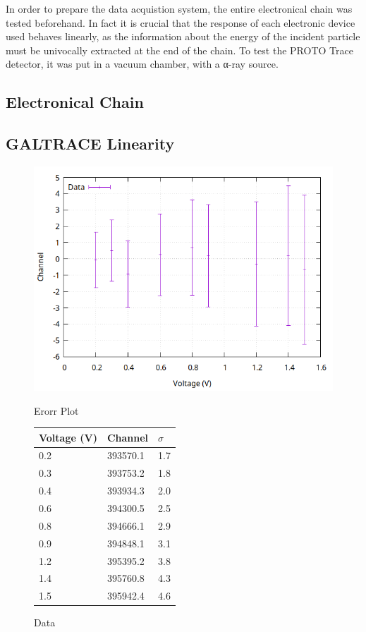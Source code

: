 In order to prepare the data acquistion system, the entire electronical chain
was tested beforehand. In fact it is crucial that the response of each
electronic device used behaves linearly, as the information about the energy
of the incident particle must be univocally extracted at the end of the chain.
To test the PROTO Trace detector, it was put in a vacuum chamber, with a α-ray
source.

\subsection{Electronical Chain}

\subsection{GALTRACE Linearity}

\begin{figure}[h]
  \centering
  \begin{minipage}[b]{0.45\textwidth}
    \includegraphics[width=\textwidth]{img/first_board_line/data_2/calib_1.png}
    \caption{Erorr Plot}
    \label{calib:plot:1}
  \end{minipage}
  \hfill
  \begin{minipage}[b]{0.45\textwidth}
  \begin{tabular}{lll}
    Voltage (V) & Channel & $\sigma$ \\
    \midrule
    0.2 & \num{393570.1} & 1.7 \\
    0.3 & \num{393753.2} & 1.8 \\
    0.4 & \num{393934.3} & 2.0 \\
    0.6 & \num{394300.5} & 2.5 \\
    0.8 & \num{394666.1} & 2.9 \\
    0.9 & \num{394848.1} & 3.1 \\
    1.2 & \num{395395.2} & 3.8 \\
    1.4 & \num{395760.8} & 4.3 \\
    1.5 & \num{395942.4} & 4.6 \\
    \bottomrule
  \end{tabular}
  \caption{Data}
  \label{calib:1}
  \end{minipage}
\end{figure}

